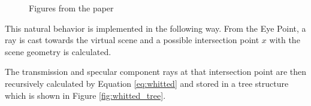 \begin{figure}[h]
	\centering
	\hfill
	\caption{Figures from the paper  \cite{whitted1979improved}}
\end{figure}

This natural behavior is implemented in the following way. From the Eye Point, a ray is cast towards the virtual scene and a possible intersection point $x$ with the scene geometry is calculated. 


The transmission and specular component rays at that intersection point are then recursively calculated by Equation \ref{eq:whitted} and stored in a tree structure which is shown in Figure \ref{fig:whitted_tree}.  


